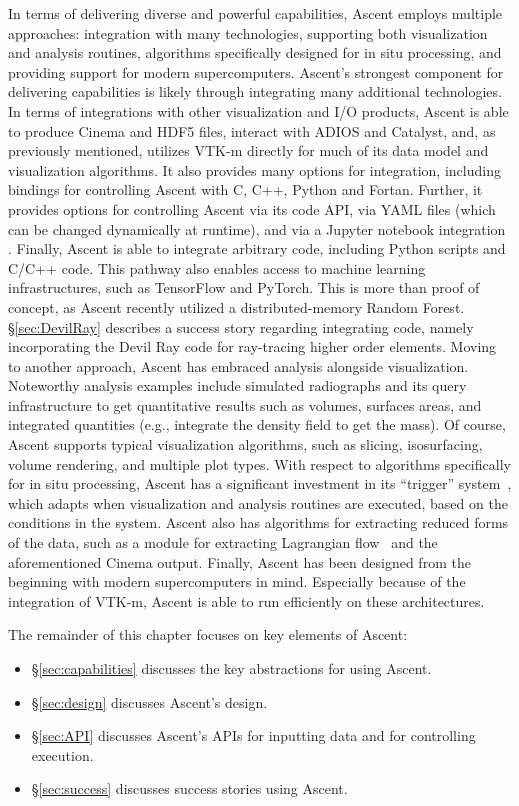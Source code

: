 In terms of delivering diverse and powerful capabilities,
Ascent employs multiple approaches:
integration with many technologies,
supporting both visualization and analysis routines,
algorithms specifically designed for in situ processing,
and providing support for modern supercomputers.
%
Ascent's strongest component for delivering capabilities is likely
through integrating many additional technologies.
%
In terms of integrations with other visualization and I/O products,
Ascent is able to produce Cinema and HDF5 files, interact with
ADIOS and Catalyst, and, as previously mentioned, utilizes VTK-m
directly for much of its data model and visualization algorithms.
%
It also provides many options for integration, including
bindings
for controlling Ascent with  C, C++, Python and Fortan.
%
Further, it provides options for controlling Ascent via its code API,
via YAML files (which can be changed dynamically at runtime), and via
a Jupyter notebook integration \cite{CyrusISAV}.
%
Finally, Ascent is able to integrate arbitrary code, including
Python scripts and C/C++ code.
%
This pathway also enables access to
machine learning infrastructures, such as TensorFlow and PyTorch.
%
This is more than proof of concept,
as Ascent recently utilized a distributed-memory Random Forest.
%
\S\ref{sec:DevilRay} describes a success story regarding integrating
code,
namely incorporating the Devil Ray code for ray-tracing higher order
elements.
%
Moving to another approach, Ascent has embraced analysis alongside
visualization.
%
Noteworthy analysis examples include simulated radiographs and its
query infrastructure to get quantitative results such as volumes,
surfaces areas, and integrated quantities (e.g., integrate the density field to get the mass).
%
Of course, Ascent supports typical visualization algorithms, such as
slicing, isosurfacing, volume rendering, and multiple plot types.
%
With respect to algorithms specifically for in situ processing, Ascent
has a significant investment in its ``trigger'' system~\cite{Larsen:ISAV18},
which adapts when visualization and analysis routines are executed,
based on the conditions in the system.
%
Ascent also has algorithms for extracting reduced forms of the data,
such as a module for extracting Lagrangian flow~\cite{Agranovsky:LDAV2014,Sane:EGPGV19} and the
aforementioned Cinema output.
%
Finally, Ascent has been designed from the beginning with modern
supercomputers in mind.
%
Especially because of the integration of VTK-m, Ascent is able to
run efficiently on these architectures.

The remainder of this chapter focuses on key elements of Ascent:
\begin{itemize}
\item \S\ref{sec:capabilities} discusses the key abstractions for using Ascent.
\item \S\ref{sec:design} discusses Ascent's design.
\item \S\ref{sec:API} discusses Ascent's APIs for inputting
data and for controlling execution.
\item \S\ref{sec:success} discusses success stories using Ascent.
\end{itemize}

